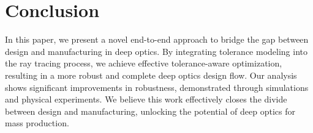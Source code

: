 \section{Conclusion}
In this paper, we present a novel end-to-end approach to bridge the gap between design and manufacturing in deep optics. By integrating tolerance modeling into the ray tracing process, we achieve effective tolerance-aware optimization, resulting in a more robust and complete deep optics design flow. Our analysis shows significant improvements in robustness, demonstrated through simulations and physical experiments. We believe this work effectively closes the divide between design and manufacturing, unlocking the potential of deep optics for mass production.
